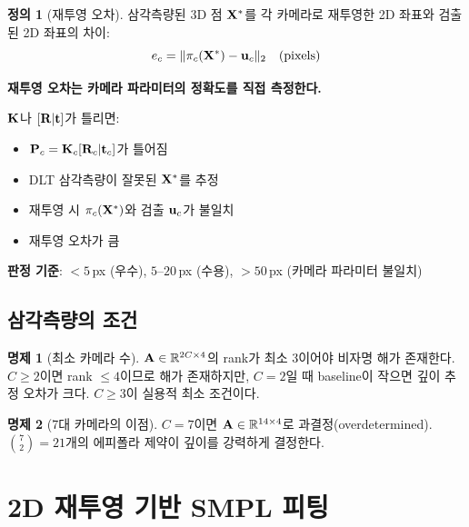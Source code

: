\documentclass[11pt, a4paper]{report}
\theoremstyle{definition}
\newtheorem{definition}{정의}[chapter]
\newtheorem{proposition}{명제}[chapter]
\theoremstyle{remark}
\begin{document}
\begin{definition}[재투영 오차]
삼각측량된 3D 점 $\mathbf{X}^*$를 각 카메라로 재투영한 2D 좌표와
검출된 2D 좌표의 차이:
\begin{equation}
e_c = \|\pi_c(\mathbf{X}^*) - \mathbf{u}_c\|_2 \quad (\text{pixels})
\label{eq:reproj_error}
\end{equation}
\end{definition}

\begin{keyidea}
\textbf{재투영 오차는 카메라 파라미터의 정확도를 직접 측정한다.}

$\mathbf{K}$나 $[\mathbf{R}|\mathbf{t}]$가 틀리면:
\begin{itemize}[nosep]
  \item $\mathbf{P}_c = \mathbf{K}_c[\mathbf{R}_c|\mathbf{t}_c]$가 틀어짐
  \item DLT 삼각측량이 잘못된 $\mathbf{X}^*$를 추정
  \item 재투영 시 $\pi_c(\mathbf{X}^*)$와 검출 $\mathbf{u}_c$가 불일치
  \item 재투영 오차가 큼
\end{itemize}

\textbf{판정 기준}:
$< 5$\,px (우수), $5$--$20$\,px (수용), $> 50$\,px (카메라 파라미터 불일치)
\end{keyidea}


\section{삼각측량의 조건}

\begin{proposition}[최소 카메라 수]
$\mathbf{A} \in \mathbb{R}^{2C \times 4}$의 rank가 최소 3이어야 비자명 해가 존재한다.
$C \geq 2$이면 rank $\leq 4$이므로 해가 존재하지만,
$C = 2$일 때 baseline이 작으면 깊이 추정 오차가 크다.
$C \geq 3$이 실용적 최소 조건이다.
\end{proposition}

\begin{proposition}[7대 카메라의 이점]
$C = 7$이면 $\mathbf{A} \in \mathbb{R}^{14 \times 4}$로 과결정(overdetermined).
$\binom{7}{2} = 21$개의 에피폴라 제약이 깊이를 강력하게 결정한다.
\end{proposition}


\chapter{2D 재투영 기반 SMPL 피팅}
\label{ch:smpl_fitting}
\end{document}
